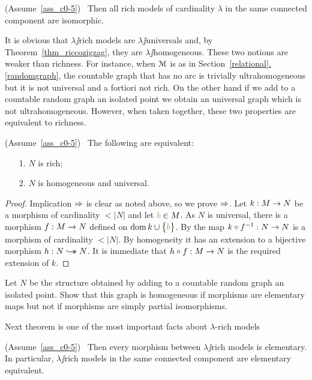 \documentclass[creche.tex]{subfiles}
\begin{document}
\begin{corollary}\label{coroll_riccozigzag}
(Assume~\ref{ass_c0-5})  \  Then all rich models of cardinality $\lambda$ in the same connected component are isomorphic.\QED
\end{corollary}

It is obvious that $\lambda\jj$rich models are $\lambda\jj$universals and, by Theorem~\ref{thm_riccozigzag}, they are $\lambda\jj$ho\-mo\-ge\-ne\-ous. These two notions are weaker than richness. For instance, when $\EuScript M$ is as in Section~\hyperref[randomgraph]{\ref*{relational}.\ref*{randomgraph}}, the countable graph that has no arc is trivially ultrahomogeneous but it is not universal and a fortiori not rich. On the other hand if we add to a countable random graph an isolated point we obtain an universal graph which is not ultrahomogeneous. However, when taken together, these two properties are equivalent to richness.

\begin{theorem}\label{ricco<->universaleomogeneo}
(Assume~\ref{ass_c0-5}) \ The following are equivalent:
\begin{itemize}
\item[1.] $N$ is rich;
\item[2.] $N$ is homogeneous and universal.
\end{itemize}
\end{theorem}
\begin{proof} 
Implication $\Rightarrow$ is clear as noted above, so we prove $\Rightarrow$. Let $k:M\rightarrow N$ be a morphism of cardinality $<|N|$ and let ${\color{brown} b}\in M$. As $N$ is universal, there is a morphism \hbox{$f:M\rightarrow N$} defined on $\mathop{\rm dom} k\cup\big\{{\color{brown} b}\big\}$. By  the map $k\circ f^{-1}:N\rightarrow N$ is a morphism of cardinality $<|N|$. By homogeneity it has an extension to a bijective morphism $h:N\hookrightarrow\mathrel{\mspace{-15mu}}\rightarrow N$. It is immediate that $h\circ f:M\rightarrow N$ is the required extension of $k$.
\end{proof}


\begin{exercise}
Let $N$ be the structure obtained by adding to a countable random graph an isolated point. Show that this graph is homogeneous if morphisms are elementary maps but not if morphisms are simply partial isomorphisms.\QED
\end{exercise}

Next theorem is one of the most important facts about $\lambda$-rich models

\begin{theorem}\label{thm_morphism_rich_elementary}
(Assume~\ref{ass_c0-5})  \  Then every morphism between $\lambda\jj$rich models is elementary. In particular, $\lambda\jj$rich models in the same connected component are elementary equivalent.
\end{theorem}
\end{document}
